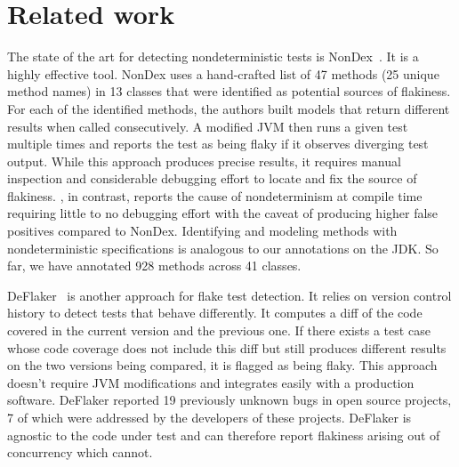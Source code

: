 \section{Related work}\label{sec:related}


The state of the art for detecting nondeterministic tests is NonDex~\cite{nondex}.  It is a highly effective tool.
NonDex uses a hand-crafted list of 47 methods (25 unique method names)
in 13 classes that were identified as potential sources of flakiness. 
For each of the identified methods, the authors built models that
return different results when called consecutively. A modified JVM then
runs a given test multiple times and reports the test as being flaky if it observes
diverging test output. While this approach produces precise results, it requires manual inspection
and considerable debugging effort to locate and fix the source of flakiness. \TheDeterminismChecker, in
contrast, reports the cause of nondeterminism at compile time requiring little to no debugging effort with the
caveat of producing higher false positives compared to NonDex. 
Identifying and modeling methods with nondeterministic
specifications is analogous to our annotations on the JDK\@. So far, we have annotated
928 methods across 41 classes.

DeFlaker~\cite{deflaker} is another approach for flake test detection. It relies on
version control history to detect tests that behave differently. It computes a diff of the code covered
in the current version and the previous one. If there exists a test case whose code coverage does not include
this diff but still produces different results on the two versions being compared, it is flagged as being flaky.
This approach doesn't require JVM modifications
and integrates easily with a production software. DeFlaker reported 19 previously unknown bugs
in open source projects, 7 of which were addressed by the developers of these projects. DeFlaker is agnostic
to the code under test and can therefore report flakiness arising out of concurrency which \TheDeterminismChecker cannot.

